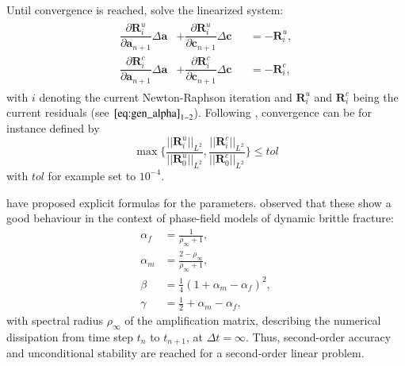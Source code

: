 Until convergence is reached, solve the linearized system:
\begin{equation} \label{eq:NewtonRaphson}
	\begin{aligned}
	\begin{alignedat}{2}
		\dfrac{\partial\mathbf{R}_{i}^{u}}{\partial\mathbf{a}_{n+1}}\Delta \mathbf{a} &+ \dfrac{\partial\mathbf{R}_{i}^{u}}{\partial\mathbf{c}_{n+1}}\Delta\mathbf{c} &&= -\mathbf{R}_{i}^{u}, \\
		\dfrac{\partial\mathbf{R}_{i}^{c}}{\partial\mathbf{a}_{n+1}}\Delta \mathbf{a} &+ \dfrac{\partial\mathbf{R}_{i}^{c}}{\partial\mathbf{c}_{n+1}}\Delta\mathbf{c} &&= -\mathbf{R}_{i}^{c},
	\end{alignedat}
	\end{aligned}
\end{equation}
with $i$ denoting the current Newton-Raphson iteration and $\mathbf{R}_{i}^{u}$ and $\mathbf{R}_{i}^{c}$ being the current residuals (see $\eqref{eq:gen_alpha}_{1-2}$). Following \citet{01_PF_dyn_brittle}, convergence can be for instance defined by
\begin{equation} \label{eq:conv_cond}
	\max\{\frac{||\mathbf{R}_{i}^{u}||_{L^{2}}}{||\mathbf{R}_{0}^{u}||_{L^{2}}},\frac{||\mathbf{R}_{i}^{c}||_{L^{2}}}{||\mathbf{R}_{0}^{c}||_{L^{2}}}\}\leq tol
\end{equation}
with $tol$ for example set to $10^{-4}$.

\citet{10_PF_genAlpha} have proposed explicit formulas for the parameters. \citet{01_PF_dyn_brittle} observed that these show a good behaviour in the context of phase-field models of dynamic brittle fracture:
\begin{equation}
	\begin{aligned}
		\alpha_{f} &= \frac{1}{\rho_{\infty}+1}, \\
		\alpha_{m} &= \frac{2-\rho_{\infty}}{\rho_{\infty}+1}, \\
		\beta &= \frac{1}{4}\left(1+\alpha_{m}-\alpha_{f}\right)^{2}, \\
		\gamma &= \frac{1}{2}+\alpha_{m}-\alpha_{f},
	\end{aligned}
\end{equation}
with spectral radius $\rho_{\infty}$ of the amplification matrix, describing the numerical dissipation from time step $t_{n}$ to $t_{n+1}$, at $\Delta t=\infty$. Thus, second-order accuracy and unconditional stability are reached for a second-order linear problem.
